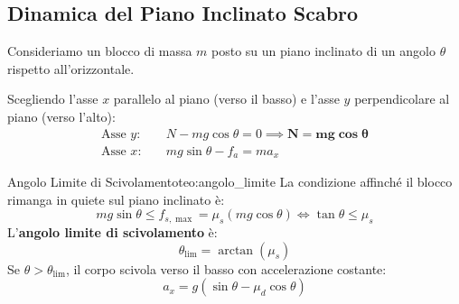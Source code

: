 \subsection{Dinamica del Piano Inclinato Scabro}
Consideriamo un blocco di massa $m$ posto su un piano inclinato di un angolo $\theta$ rispetto all'orizzontale.

\begin{center}
\end{center}

Scegliendo l'asse $x$ parallelo al piano (verso il basso) e l'asse $y$ perpendicolare al piano (verso l'alto):
\begin{align}
    \text{Asse } y: \quad & N - mg\cos\theta = 0 \implies \mathbf{N = mg\cos\theta} \label{eq:piano_n} \\
    \text{Asse } x: \quad & mg\sin\theta - f_a = m a_x \label{eq:piano_x}
\end{align}

\begin{teorema}{Angolo Limite di Scivolamento}{teo:angolo_limite}
La condizione affinché il blocco rimanga in quiete sul piano inclinato è:
\begin{equation}
    mg\sin\theta \le f_{s,\max} = \mu_s (mg\cos\theta) \iff \tan\theta \le \mu_s
\end{equation}
L'\textbf{angolo limite di scivolamento} è:
\begin{equation}
    \theta_{\text{lim}} = \arctan(\mu_s)
\end{equation}
Se $\theta > \theta_{\text{lim}}$, il corpo scivola verso il basso con accelerazione costante:
\begin{equation}
    a_x = g(\sin\theta - \mu_d \cos\theta)
\end{equation}
\end{teorema}

